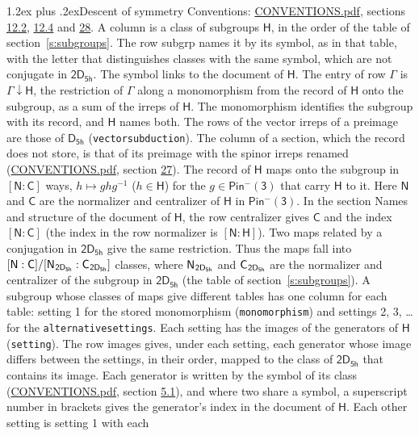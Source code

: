 \documentclass[10pt,a4paper]{article}
\makeatletter
\renewcommand\section{\@startsection{section}{1}{\z@}{-3ex plus -1ex minus -.2ex}%
  {1.2ex plus .2ex}{\normalfont\large\sffamily\bfseries\color{parttitle}}}
\numberwithin{equation}{section}
\newcommand{\grp}[1]{\mathsf{#1}}
\newcommand{\grpindex}[2]{[#1 : #2]}
\newcommand{\restr}[2]{#1\!\downarrow#2}
\newcommand{\hairsp}{\mkern1mu}
\makeatother
\begin{document}
\section{Descent of symmetry}\label{s:subduction}
Conventions: \href{../../CONVENTIONS.pdf}{CONVENTIONS.pdf}, sections \href{../../../rotation/CONVENTIONS.pdf\#conv.12.2}{12.2}, \href{../../../rotation/CONVENTIONS.pdf\#conv.12.4}{12.4} and \href{../../CONVENTIONS.pdf\#conv.28}{28}.
A column is a class of subgroups $\grp{H}$, in the order of the table of section~\ref{s:subgroups}. The row subgrp names it by its symbol, as in that table, with the letter that distinguishes classes with the same symbol, which are not conjugate in $\grp{2D_{5h}}$. The symbol links to the document of $\grp{H}$. The entry of row $\Gamma$ is $\restr{\Gamma}{\grp{H}}$, the restriction of $\Gamma$ along a monomorphism from the record of $\grp{H}$ onto the subgroup, as a sum of the irreps of $\grp{H}$. The monomorphism identifies the subgroup with its record, and $\grp{H}$ names both. The rows of the vector irreps of a preimage are those of \href{../../../rotation/data/pdf/D5h.pdf}{$\grp{D_{5h}}$} (\texttt{vectorsubduction}). The column of a section, which the record does not store, is that of its preimage with the spinor irreps renamed (\href{../../CONVENTIONS.pdf}{CONVENTIONS.pdf}, section \href{../../CONVENTIONS.pdf\#conv.27}{27}). \label{n:group.normalizer.o3}\label{n:group.centralizer.o3}\label{n:element.h}The record of $\grp{H}$ maps onto the subgroup in $\grpindex{\grp{N}}{\grp{C}}$ ways, $h \mapsto g h g^{-1}$ ($h \in \grp{H}$) for the $g \in \grp{Pin^{-}(3)}$ that carry $\grp{H}$ to it. Here $\grp{N}$ and $\grp{C}$ are the normalizer and centralizer of $\grp{H}$ in \href{Pinminus3.pdf}{$\grp{Pin^{-}(3)}$}. In the section Names and structure of the document of $\grp{H}$, the row centralizer gives $\grp{C}$ and the index $\grpindex{\grp{N}}{\grp{C}}$ (the index in the row normalizer is $\grpindex{\grp{N}}{\grp{H}}$). Two maps related by a conjugation in $\grp{2D_{5h}}$ give the same restriction. Thus the maps fall into $\grpindex{\grp{N}}{\grp{C}}/\grpindex{\grp{N}_{\hairsp \grp{2D_{5h}}}}{\grp{C}_{\hairsp \grp{2D_{5h}}}}$ classes, where $\grp{N}_{\hairsp \grp{2D_{5h}}}$ and $\grp{C}_{\hairsp \grp{2D_{5h}}}$ are the normalizer and centralizer of the subgroup in $\grp{2D_{5h}}$ (the table of section~\ref{s:subgroups}). \label{n:head.setting}A subgroup whose classes of maps give different tables has one column for each table: setting 1 for the stored monomorphism (\texttt{monomorphism}) and settings 2, 3, \dots{} for the \texttt{alternativesettings}. Each setting has the images of the generators of $\grp{H}$ (\texttt{setting}). \label{n:head.images}The row images gives, under each setting, each generator whose image differs between the settings, in their order, mapped to the class of $\grp{2D_{5h}}$ that contains its image. Each generator is written by the symbol of its class (\href{../../CONVENTIONS.pdf}{CONVENTIONS.pdf}, section \href{../../../rotation/CONVENTIONS.pdf\#conv.5.1}{5.1}), and where two share a symbol, a superscript number in brackets gives the generator's index in the document of $\grp{H}$. \label{n:irrep.Delta}Each other setting is setting 1 with each 
\end{document}
